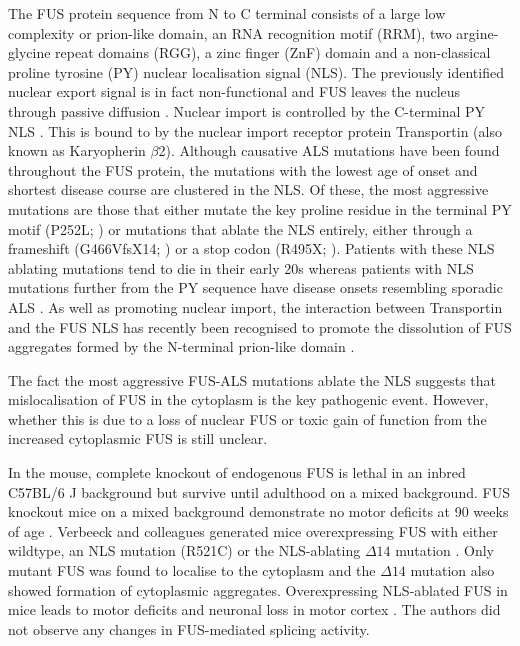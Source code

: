 The FUS protein sequence from N to C terminal consists of a large low complexity or prion-like domain, an RNA recognition motif (RRM), two argine-glycine repeat domains (RGG), a zinc finger (ZnF) domain and a  non-classical proline tyrosine (PY) nuclear localisation signal (NLS). 
The previously identified nuclear export signal is in fact non-functional and FUS leaves the nucleus through passive diffusion \citep{Ederle2018}. 
Nuclear import is controlled by the C-terminal PY NLS \citep{Dormann2010}. This is bound to by the nuclear import receptor protein Transportin (also known as Karyopherin $\beta$2).
Although causative ALS mutations have been found throughout the FUS protein, the mutations with the lowest age of onset and shortest disease course are clustered in the NLS. 
Of these, the most aggressive mutations are those that either mutate the key proline residue in the terminal PY motif (P252L; \citep{Chio2009}) or mutations that ablate the NLS entirely, either through a frameshift (G466VfsX14; \citep{DeJesus-Hernandez2010}) or a stop codon (R495X; \citep{Bosco2010}). 
Patients with these NLS ablating mutations tend to die in their early 20s whereas patients with NLS mutations further from the PY sequence have disease onsets resembling sporadic ALS \citep{Shang2016}.
As well as promoting nuclear import, the interaction between Transportin and the FUS NLS has recently been recognised to promote the dissolution of FUS aggregates formed by the N-terminal prion-like domain \citep{Guo2018, Yoshizawa2018}.


The fact the most aggressive FUS-ALS mutations ablate the NLS suggests that mislocalisation of FUS in the cytoplasm is the key pathogenic event. However, whether this is due to a loss of nuclear FUS or toxic gain of function from the increased cytoplasmic FUS is still unclear.

In the mouse, complete knockout of endogenous FUS is lethal in an inbred C57BL/6 J background  \citep{Hicks2000, Kuroda2000} but survive until adulthood on a mixed background. 
FUS knockout mice on a mixed background demonstrate no motor deficits at 90 weeks of age \citep{Kino2015}.
Verbeeck and colleagues generated mice overexpressing FUS with either wildtype, an NLS mutation (R521C) or the NLS-ablating $\Delta14$ mutation \cite{Verbeeck2012}. Only mutant FUS was found to localise to the cytoplasm and the $\Delta14$ mutation also showed formation of cytoplasmic aggregates. 
Overexpressing NLS-ablated FUS in mice leads to motor deficits and neuronal loss in motor cortex \citep{Shiihashi2016}. The authors did not observe any changes in FUS-mediated splicing activity.


